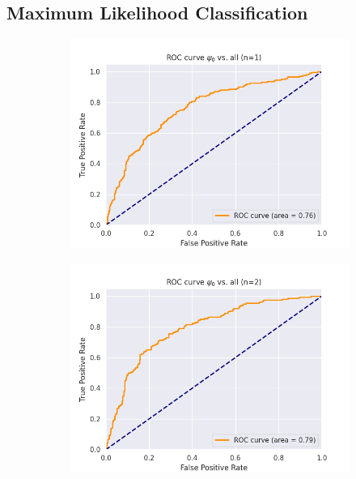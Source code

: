 \subsection{Maximum Likelihood Classification}
\begin{figure}[htb]
	\begin{subfigure}{.33\textwidth}
		\centering
		\includegraphics[width=1\linewidth]{figures/AUROC_600samples_class0_llh_n1}
		\caption{}
		\label{fig:sfig1}
	\end{subfigure}%
	\begin{subfigure}{.33\textwidth}
		\centering
		\includegraphics[width=1\linewidth]{figures/AUROC_600samples_class0_llh_n2}
		\caption{}
		\label{fig:sfig2}
	\end{subfigure}

\end{figure}
